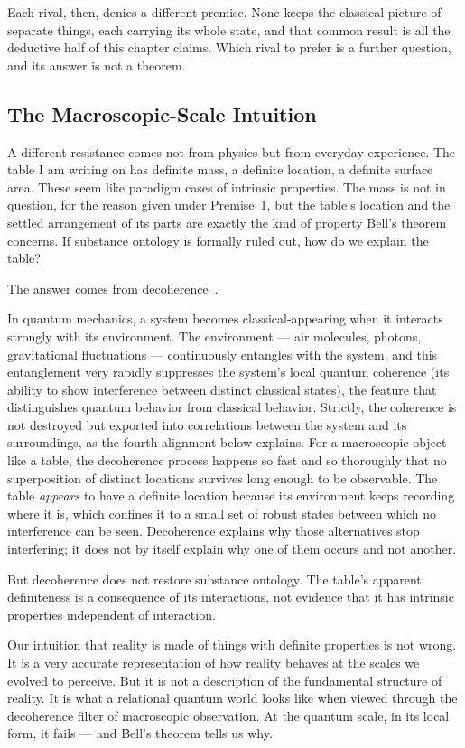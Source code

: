 Each rival, then, denies a different premise.
None keeps the classical picture of separate things, each carrying its whole
state, and that common result is all the deductive half of this chapter claims.
Which rival to prefer is a further question, and its answer is not a theorem.

\subsection*{The Macroscopic-Scale Intuition}

A different resistance comes not from physics but from everyday experience.
The table I am writing on has definite mass, a definite location, a definite
surface area.
These seem like paradigm cases of intrinsic properties.
The mass is not in question, for the reason given under Premise~1, but the
table's location and the settled arrangement of its parts are exactly the kind of
property Bell's theorem concerns.
If substance ontology is formally ruled out, how do we explain the table?

The answer comes from decoherence~\citep{Zurek2003}.

In quantum mechanics, a system becomes classical-appearing when it interacts
strongly with its environment.
The environment --- air molecules, photons, gravitational fluctuations ---
continuously entangles with the system, and this entanglement very rapidly
suppresses the system's local quantum coherence (its ability to show
interference between distinct classical states), the feature that distinguishes
quantum behavior from classical behavior.
Strictly, the coherence is not destroyed but exported into correlations between
the system and its surroundings, as the fourth alignment below explains.
For a macroscopic object like a table, the decoherence process happens so fast
and so thoroughly that no superposition of distinct locations survives long
enough to be observable.
The table \emph{appears} to have a definite location because its environment
keeps recording where it is, which confines it to a small set of robust states
between which no interference can be seen.
Decoherence explains why those alternatives stop interfering; it does not by
itself explain why one of them occurs and not another.

But decoherence does not restore substance ontology.
The table's apparent definiteness is a consequence of its interactions, not
evidence that it has intrinsic properties independent of interaction.

Our intuition that reality is made of things with definite properties is not
wrong.
It is a very accurate representation of how reality behaves at the scales we
evolved to perceive.
But it is not a description of the fundamental structure of reality.
It is what a relational quantum world looks like when viewed through the
decoherence filter of macroscopic observation.
At the quantum scale, in its local form, it fails --- and Bell's theorem tells us
why.


